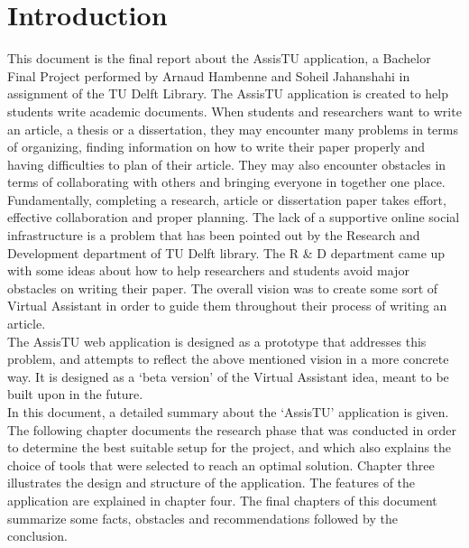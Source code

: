 \chapter{Introduction}

This document is the final report about the AssisTU application, a Bachelor Final Project performed by Arnaud Hambenne and Soheil Jahanshahi in
assignment of the TU Delft Library. 
The AssisTU application is created to help students write academic documents. When students and researchers want to write an article, a thesis or a 
dissertation, they may encounter many problems in terms of organizing, finding information on how to write their paper properly and having difficulties 
to plan of their article. They may also encounter obstacles in terms of collaborating with others and bringing everyone in together one place. \\

Fundamentally, completing a research, article or dissertation paper takes effort, effective collaboration and proper planning. The lack of a supportive
online social infrastructure is a problem that has been pointed out by the Research and Development department of TU Delft library. The R \& D department came 
up with some ideas about how to help researchers and students avoid major obstacles on writing their paper. The overall vision was to create some sort 
of Virtual Assistant in order to guide them throughout their process of writing an article.\\

The AssisTU web application is designed as a prototype that addresses this problem, and attempts to reflect the above mentioned vision in a more 
concrete way. It is designed as a `beta version' of the Virtual Assistant idea, meant to be built upon in the future.\\ 

In this document, a detailed summary about the `AssisTU' application is given. The following chapter documents the research phase that was conducted in 
order to determine the best suitable setup for the project, and which also explains the choice of tools that were selected to reach an optimal solution. 
Chapter three illustrates the design and structure of the application. The features of the application are explained in chapter four. The final chapters 
of this document summarize some facts, obstacles and recommendations followed by the conclusion.  